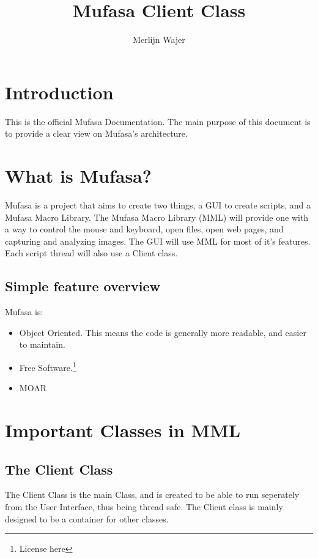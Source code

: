 \documentclass[a4paper, 10pt]{article}
\begin{document}
\title{Mufasa Client Class}
\author{Merlijn Wajer}
\maketitle

\section{Introduction}

This is the official Mufasa Documentation.
The main purpose of this document is to provide a clear view on Mufasa's architecture.

\section{What is Mufasa?}

Mufasa is a project that aims to create two things, a GUI to create scripts, and a Mufasa Macro Library.
The Mufasa Macro Library (MML) will provide one with a way to control the mouse and keyboard, open files, open web pages, and capturing and analyzing images.
The GUI will use MML for most of it's features. Each script thread will also use a Client class.

\subsection{Simple feature overview}

Mufasa is:
\begin{itemize}
	\item Object Oriented. This means the code is generally more
		  readable, and easier to maintain.
	\item Free Software.\footnote{License here}
	\item MOAR
\end{itemize}

\section{Important Classes in MML}

\subsection{The Client Class}

The Client Class is the main Class, and is created to be able
 to run seperately from the User Interface, thus being thread safe.
The Client class is mainly designed to be a container for other classes.
\end{document}
